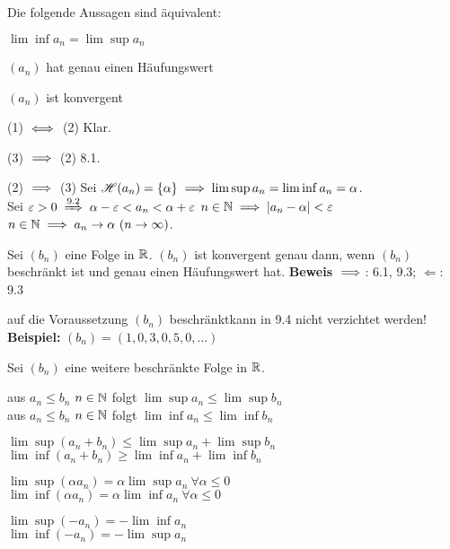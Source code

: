 \documentclass[a4paper,twoside,DIV15,BCOR12mm]{scrbook}
\begin{document}
\begin{satz}
Die folgende  Aussagen sind äquivalent:
\begin{liste}
\item $\lim\inf a_n = \lim\sup a_n$
\item $(a_n)$ hat genau einen Häufungswert
\item $(a_n)$ ist konvergent
\end{liste}
\end{satz}

\begin{beweise}
\item{(1) $\iff$ (2)} Klar.
\item{(3) $\implies$ (2)} 8.1.
\item{(2) $\implies$ (3)} Sei $\mathscr{H}(a_n) = \{\alpha\} \implies \lim\sup a_n = \lim\inf a_n = \alpha$.\\
Sei $\ep>0 \folgtnach{9.2} \alpha - \ep < a_n < \alpha + \ep$ \ffa $n\in\mathbb{N} \implies |a_n- \alpha| < \varepsilon$ \ffa $n\in\MdN \folgt a_n\to\alpha \ (n\to\infty)$.
\end{beweise}

\begin{folgerung}
Sei $(b_n)$ eine Folge in $\mathbb{R}$. $(b_n)$ ist konvergent genau dann, wenn $(b_n)$ beschränkt ist und genau einen Häufungswert hat.
\textbf{Beweis}
\glqq$\implies$\grqq: 6.1, 9.3; \glqq$\Leftarrow$\grqq: 9.3
\end{folgerung}

\begin{beispiel}
auf die Voraussetzung \glqq$(b_n)$ beschränkt\grqq kann in 9.4 nicht verzichtet werden!\\
\textbf{Beispiel:} $(b_n)=(1,0,3,0,5,0,\ldots)$
\end{beispiel}

\begin{satz}
Sei $(b_n)$ eine weitere beschränkte Folge  in $\mathbb{R}$.
\begin{liste}
\item aus $a_n \le b_n$ \ffa $ n\in\mathbb{N}$ folgt $\lim\sup a_n \le \lim\sup b_n$ \\
aus $a_n \le b_n$ \ffa $ n\in\mathbb{N}$ folgt $\lim\inf a_n \le \lim\inf b_n$
\item $\lim\sup(a_n + b_n) \le \lim\sup a_n + \lim\sup b_n$ \\
$\lim\inf(a_n + b_n) \ge \lim\inf a_n + \lim\inf b_n$
\item $\lim\sup(\alpha a_n) = \alpha\lim\sup a_n \ \forall \alpha \le 0$\\
$\lim\inf(\alpha a_n) = \alpha\lim\inf a_n \ \forall \alpha \le 0$
\item $\lim\sup(- a_n) = -\lim\inf a_n$\\
$\lim\inf(- a_n) = -\lim\sup a_n$

\end{liste}
\end{satz}
\end{document}
